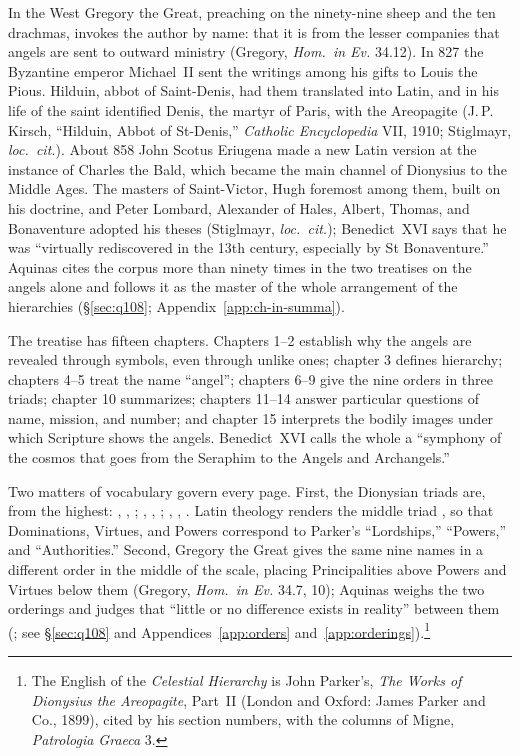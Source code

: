 In the West Gregory the Great, preaching on the ninety-nine sheep and the
ten drachmas, invokes the author by name:  that it is
from the lesser companies that angels are sent to outward ministry
(Gregory, \emph{Hom.\ in Ev.} 34.12). In 827 the Byzantine emperor
Michael~II sent the writings among his gifts to Louis the Pious. Hilduin,
abbot of Saint-Denis, had them translated into Latin, and in his life of
the saint identified Denis, the martyr of Paris, with the Areopagite
(J.\,P. Kirsch, ``Hilduin, Abbot of St-Denis,'' \emph{Catholic
Encyclopedia} VII, 1910; Stiglmayr, \emph{loc.\ cit.}). About 858 John
Scotus Eriugena made a new Latin version at the instance of Charles the
Bald, which became the main channel of Dionysius to the Middle Ages. The
masters of Saint-Victor, Hugh foremost among them, built on his doctrine,
and Peter Lombard, Alexander of Hales, Albert, Thomas, and Bonaventure
adopted his theses (Stiglmayr, \emph{loc.\ cit.}); Benedict~XVI says that
he was ``virtually rediscovered in the 13th century, especially by St
Bonaventure.'' Aquinas cites the corpus more than ninety times in the two
treatises on the angels alone and follows it as the master of the whole
arrangement of the hierarchies (\S\ref{sec:q108};
Appendix~\ref{app:ch-in-summa}).

The treatise has fifteen chapters. Chapters 1--2 establish why the
angels are revealed through symbols, even through unlike ones; chapter 3
defines hierarchy; chapters 4--5 treat the name ``angel''; chapters 6--9
give the nine orders in three triads; chapter 10 summarizes; chapters
11--14 answer particular questions of name, mission, and number; and
chapter 15 interprets the bodily images under which Scripture shows the
angels. Benedict~XVI calls the whole a ``symphony of the cosmos that goes
from the Seraphim to the Angels and Archangels.''

Two matters of vocabulary govern every page. First, the Dionysian triads
are, from the highest: , , ;
, , ; ,
, . Latin theology renders the middle triad
, so that Dominations, Virtues,
and Powers correspond to Parker's ``Lordships,'' ``Powers,'' and
``Authorities.'' Second, Gregory the Great gives the same nine names in a
different order in the middle of the scale, placing Principalities above
Powers and Virtues below them (Gregory, \emph{Hom.\ in Ev.} 34.7,
10); Aquinas weighs the two orderings and judges that ``little or no
difference exists in reality'' between them (;
see \S\ref{sec:q108} and Appendices~\ref{app:orders} and~\ref{app:orderings}).\footnote{The
English of the \emph{Celestial Hierarchy} is John Parker's, \emph{The
Works of Dionysius the Areopagite}, Part~II (London and Oxford: James
Parker and Co., 1899), cited by his section numbers, with the columns of
Migne, \emph{Patrologia Graeca} 3.}


